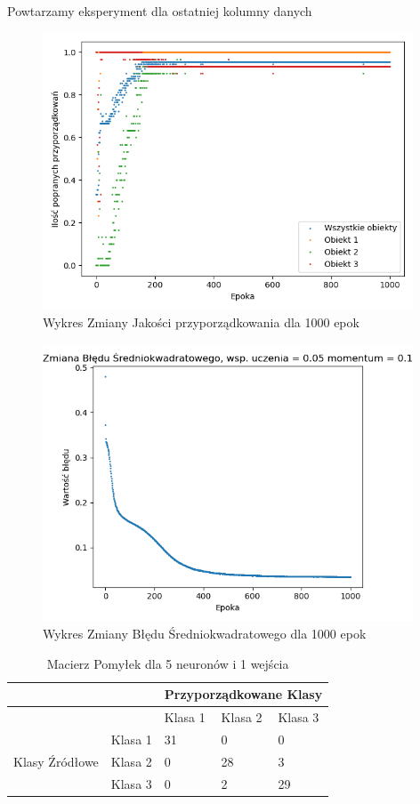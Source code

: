 \documentclass[12pt]{article}
\begin{document}
\newpage

Powtarzamy eksperyment dla ostatniej kolumny danych

\begin{figure}[!ht]
 \centering
 \includegraphics[width=11cm]{WykresPrzyporzadkowania5neuron1wejscia3.png}
 \caption{Wykres Zmiany Jakości przyporządkowania dla 1000 epok}
 \vspace{-0.1cm}
 \label{WykresPrzyp20}
\end{figure}

\newpage

\begin{figure}[!ht]
 \centering
 \includegraphics[width=11cm]{WykresBlad5neuron1wejscia3.png}
 \caption{Wykres Zmiany Błędu Średniokwadratowego dla 1000 epok}
 \vspace{-0.1cm}
 \label{WykresBlad20}
\end{figure}

\begin{table}
\caption{\label{tab:tablica19} Macierz Pomyłek dla 5 neuronów  i 1 wejścia}
\begin{tabular}{ |p{3cm}|p{3cm}|p{2cm}|p{2cm}|p{2cm}|  }
 \hline
 & & 
 \multicolumn{3}{|c|}{Przyporządkowane Klasy} \\
 \hline

   & & Klasa 1 & Klasa 2 & Klasa 3\\
 \hline
\multirow{3}{4em}{Klasy Źródłowe}
   & Klasa 1 & 31 & 0 & 0 \\ 
   & Klasa 2 & 0  & 28 & 3 \\
   & Klasa 3 & 0  & 2  & 29 \\
 \hline
\end{tabular}
\end{table}
\end{document}
